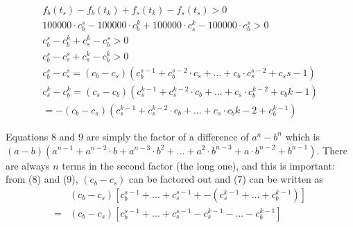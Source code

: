 \documentclass[11pt]{article}
\begin{document}
\begin{flushleft}
\begin{enumerate}
{\begin{enumerate}
{				      					      		      				      				      \begin{center}
				      					      		      				      				      	\begin{align}
				      					      		      				      				      		f_b(t_s) - f_b(t_k) + f_s(t_k) - f_s(t_s) > 0 \nonumber                                                     \\
				      					      		      				      				      		100000\cdot c_b^s - 100000\cdot c_b^k + 100000\cdot c_s^k - 100000\cdot c_b^s > 0 \nonumber                 \\
				      					      		      				      				      		c_b^s - c_b^k + c_s^k - c_b^s > 0 \nonumber                                                                 \\
				      					      		      				      				      		c_b^s - c_s^s + c_s^k - c_b^k > 0                                                                           \\
				      					      		      				      				      		c_b^s - c_s^s = (c_b - c_s)(c_b^{s-1} + c_b^{s-2}\cdot c_s + ... + c_b\cdot c_s^{s-2} + c_s{s-1})           \\
				      					      		      				      				      		c_s^k - c_b^k = (c_s - c_b)(c_s^{k-1} + c_s^{k-2}\cdot c_b + ... + c_s\cdot c_b^{k-2} + c_b{k-1}) \nonumber \\
				      					      		      				      				      		= -(c_b - c_s)(c_s^{k-1} + c_s^{k-2}\cdot c_b + ... + c_s\cdot c_b{k-2} + c_b^{k-1})                        
				      					      		      				      				      	\end{align}
				      					      		      				      				      \end{center}
				      					      		      				      				      Equations 8 and 9 are simply the factor of a difference of $a^n-b^n$ which is $(a-b)(a^{n-1} + a^{n-2}\cdot b + a ^{n-3} \cdot b^2 + ... + a^2\cdot b^{n-3} + a\cdot b^{n-2} + b^{n-1})$. There are always $n$ terms in the second factor (the long one), and this is important: from (8) and (9), $(c_b - c_s)$ can be factored out and (7) can be written as
				      					      		      				      				      \begin{align}
				      					      		      				      				      	  & (c_b - c_s)[c_b^{s-1} + ... + c_s^{s-1} + -(c_s^{k-1} + ... + c_b^{k-1})] \nonumber \\
				      					      		      				      				      	= & (c_b - c_s)[c_b^{s-1} + ... + c_s^{s-1} - c_s^{k-1}  - ... - c_b^{k-1}] \nonumber   \\

\end{align}}
\end{enumerate}}
\end{enumerate}
\end{flushleft}
\end{document}
